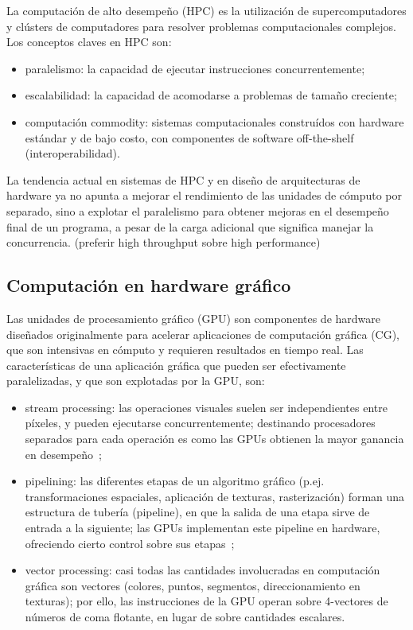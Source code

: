 \documentclass[11pt,spanish]{article}
\begin{document}
La computación de alto desempeño (HPC) es la utilización de supercomputadores y
clústers de computadores para resolver problemas computacionales complejos.  Los
conceptos claves en HPC son:
\begin{itemize}
   \item paralelismo:
     la capacidad de ejecutar instrucciones concurrentemente;
   \item escalabilidad:
     la capacidad de acomodarse a problemas de tamaño creciente;
   \item computación commodity:
     sistemas computacionales construídos con hardware
     estándar y de bajo costo, con componentes de software off-the-shelf
     (interoperabilidad).
\end{itemize}
La tendencia actual en sistemas de HPC y en diseño de arquitecturas de hardware
ya no apunta a mejorar el rendimiento de las unidades de cómputo por separado,
sino a explotar el paralelismo para obtener mejoras en el desempeño final de un
programa, a pesar de la carga adicional que significa manejar la concurrencia.
(preferir high throughput sobre high performance)
\cite{hpc-gpu-cuda-slides}

\subsection{Computación en hardware gráfico}
Las unidades de procesamiento gráfico (GPU) son componentes de hardware diseñados
originalmente para acelerar aplicaciones de computación gráfica (CG), que son
intensivas en cómputo y requieren resultados en tiempo real.  Las
características de una aplicación gráfica que pueden ser efectivamente
paralelizadas, y que son explotadas por la GPU, son:
\begin{itemize}
  \item stream processing:
    las operaciones visuales suelen ser independientes entre
    píxeles, y pueden ejecutarse concurrentemente;  destinando procesadores
    separados para cada operación es como las GPUs obtienen la mayor ganancia
    en desempeño~\cite[\S3.2]{gpupp};
  \item pipelining:
    las diferentes etapas de un algoritmo gráfico (p.ej.
    transformaciones espaciales, aplicación de texturas, rasterización)
    forman una estructura de tubería (pipeline), en que la salida de una etapa
    sirve de entrada a la siguiente;  las GPUs implementan este pipeline en
    hardware, ofreciendo cierto control sobre sus etapas~\cite[\S3.1]{pygpu};
  \item vector processing:
    casi todas las cantidades involucradas en computación
    gráfica son vectores (colores, puntos, segmentos, direccionamiento en
    texturas); por ello, las instrucciones de la GPU operan sobre 4-vectores de
    números de coma flotante, en lugar de sobre cantidades escalares.
    \cite[\S3.3]{gpupp}
\end{itemize}
\end{document}
